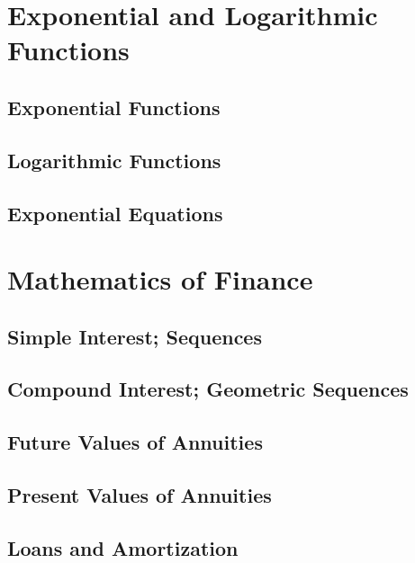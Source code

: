 \documentclass[12pt]{amsart}
\begin{document}
\section{Exponential and Logarithmic Functions}


\subsection{Exponential Functions}

\newpage
\subsection{Logarithmic Functions}

\newpage
\subsection{Exponential Equations}

\newpage
\section{Mathematics of Finance}

\subsection{Simple Interest; Sequences}

\newpage
\subsection{Compound Interest; Geometric Sequences }

\newpage
\subsection{Future Values of Annuities}

\newpage
\subsection{Present Values of Annuities}

\newpage
\subsection{Loans and Amortization}
\end{document}
